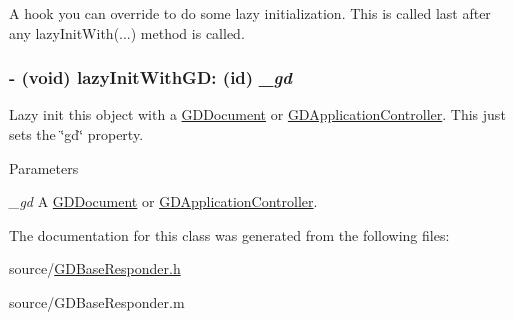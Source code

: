 A hook you can override to do some lazy initialization. This is called last after any lazyInitWith(...) method is called. \hypertarget{interface_g_d_base_responder_a395637f6f067d9d84ec073bd3b1af0ac}{
\subsubsection[{lazyInitWithGD:}]{\setlength{\rightskip}{0pt plus 5cm}-\/ (void) lazyInitWithGD: (id) {\em \_\-gd}}}
\label{interface_g_d_base_responder_a395637f6f067d9d84ec073bd3b1af0ac}


Lazy init this object with a \hyperlink{interface_g_d_document}{GDDocument} or \hyperlink{interface_g_d_application_controller}{GDApplicationController}. This just sets the \char`\"{}gd\char`\"{} property.


\begin{DoxyParams}{Parameters}
\item[{\em \_\-gd}]A \hyperlink{interface_g_d_document}{GDDocument} or \hyperlink{interface_g_d_application_controller}{GDApplicationController}. \end{DoxyParams}


The documentation for this class was generated from the following files:\begin{DoxyCompactItemize}
\item 
source/\hyperlink{_g_d_base_responder_8h}{GDBaseResponder.h}\item 
source/GDBaseResponder.m\end{DoxyCompactItemize}
